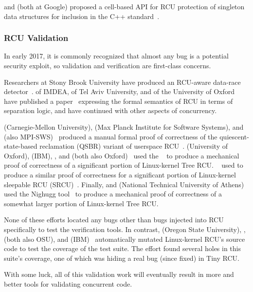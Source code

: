  and  (both at Google) proposed
a cell-based API for RCU
protection of singleton data structures for inclusion in the
C++ standard~\cite{GeoffRomer2017C++DeferredReclamation}.

\subsubsection{RCU Validation}
\label{sec:defer:RCU Validation}

In early 2017, it is commonly recognized that almost any bug is a potential
security exploit, so validation and verification are first-class concerns.

Researchers at Stony Brook University have produced an RCU-aware data-race
detector~\cite{AbhinavDuggal2010Masters,JustinSeyster2012PhD,Seyster:2011:RFA:2075416.2075425}.
 of IMDEA,  of Tel Aviv University,
and  of the University of Oxford have published a
paper~\cite{AlexeyGotsman2012VerifyGraceExtended} expressing the formal
semantics of RCU in terms of separation logic, and have continued with
other aspects of concurrency.

 (Carnegie-Mellon University),  (Max
Planck Institute for Software Systems), and 
(also MPI-SWS)~\cite{JosephTassarotti2015RCUproof}
produced a manual formal proof of correctness of the quiescent-state-based
reclamation (QSBR) variant of userspace
RCU~\cite{MathieuDesnoyers2009URCU,MathieuDesnoyers2012URCU}.
 (University of Oxford),  (IBM),
, and 
(both also Oxford)~\cite{LihaoLiang2016VerifyTreeRCU}
used the ~\cite{EdmundClarke2004CBMC}
to produce a mechanical proof of correctness of a significant portion
of Linux-kernel Tree RCU.
~\cite{LanceRoy2017CBMC-SRCU} used  to produce a similar
proof of correctness for a significant portion of Linux-kernel
sleepable RCU (SRCU)~\cite{PaulEMcKenney2006c}.
Finally,  and 
(National Technical University of
Athens)~\cite{MichalisKokologiannakis2017NidhuggRCU}
used the Nighugg tool~\cite{CarlLeonardsson2014Nidhugg}
to produce a mechanical proof of correctness of a somewhat larger
portion of Linux-kernel Tree RCU.

None of these efforts located any bugs other than bugs injected into
RCU specifically to test the verification tools.
In contrast,
 (Oregon State University), ,
 (both also OSU), and 
(IBM)~\cite{Groce:2015:VMC:2916135.2916190}
automatically mutated Linux-kernel RCU's source code to test the
coverage of the  test suite.
The effort found several holes in this suite's coverage, one of which
was hiding a real bug (since fixed) in Tiny RCU.

With some luck, all of this validation work will eventually result in
more and better tools for validating concurrent code.
